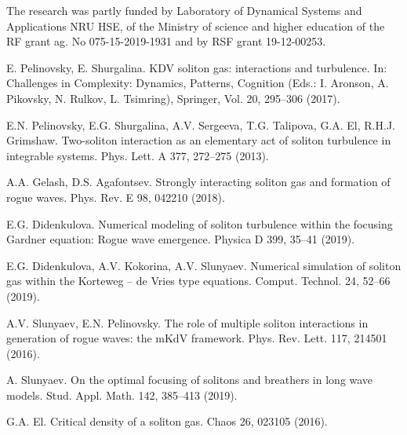 The research was partly funded by Laboratory of Dynamical Systems and Applications NRU HSE, of the Ministry of science and higher education of the RF grant ag. No 075-15-2019-1931 and by RSF grant 19-12-00253.

\begin{thebibliography}{99}

E. Pelinovsky, E. Shurgalina. KDV soliton gas: interactions and turbulence. In: Challenges in Complexity: Dynamics, Patterns, Cognition (Eds.: I. Aronson, A. Pikovsky, N. Rulkov, L. Tsimring), Springer, Vol. 20, 295--306 (2017).

E.N. Pelinovsky, E.G. Shurgalina, A.V. Sergeeva, T.G. Talipova,
G.A. El, R.H.J. Grimshaw.
Two-soliton interaction as an elementary act of soliton turbulence
in integrable systems.
Phys. Lett. A 377, 272--275 (2013).

A.A. Gelash, D.S. Agafontsev. Strongly interacting soliton gas and formation of rogue
waves. Phys. Rev. E 98, 042210 (2018).

E.G. Didenkulova. Numerical modeling of soliton turbulence within the focusing Gardner equation: Rogue wave emergence. Physica D 399, 35--41 (2019).

E.G. Didenkulova, A.V. Kokorina, A.V. Slunyaev. Numerical simulation of soliton gas within the Korteweg -- de Vries type equations. Comput. Technol. 24, 52--66 (2019).

A.V. Slunyaev, E.N. Pelinovsky. The role of multiple soliton interactions in generation of rogue waves: the mKdV framework. Phys. Rev. Lett. 117, 214501 (2016).

A. Slunyaev. On the optimal focusing of solitons and breathers in long wave models. Stud. Appl. Math. 142, 385--413 (2019).

G.A. El. Critical density of a soliton gas. Chaos 26, 023105 (2016).
	
\end{thebibliography}

